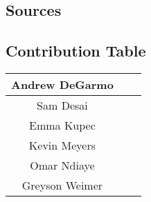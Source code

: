 \subsection{Sources}

 

\subsection{Contribution Table}
\begin{center}
    \begin{tabular}{|c|m{5cm}|m{5cm}|}
        \hline
        Andrew DeGarmo & \makecell{} & \makecell{} \\
        \hline
        Sam Desai & \makecell{} & \\
        \hline
        Emma Kupec & \makecell{} & \makecell{} \\
        \hline
        Kevin Meyers & \makecell{} & \makecell{} \\
        \hline
        Omar Ndiaye & \makecell{} & \\
        \hline
        Greyson Weimer & \makecell{} & \makecell{} \\
        \hline
    \end{tabular}
\end{center}

